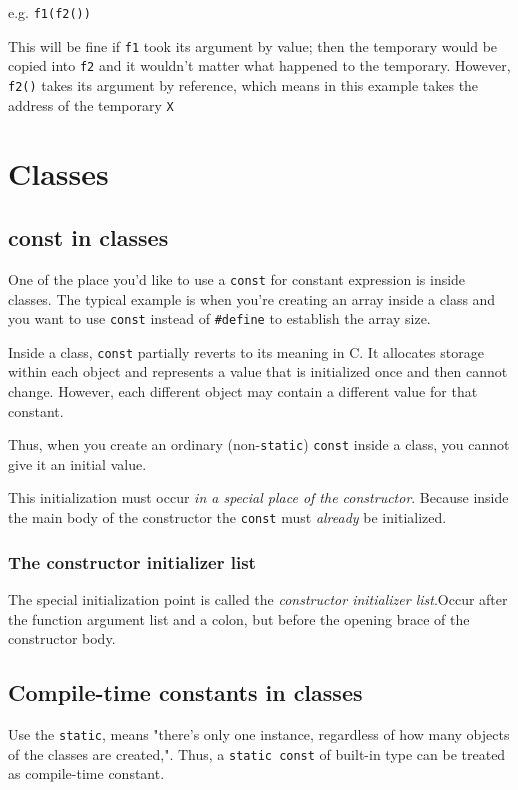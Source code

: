 \documentclass[11pt, a4paper]{book}
\begin{document}
e.g. \verb|f1(f2())|

This will be fine if \verb|f1| took its argument by value; then the temporary
would be copied into \verb|f2| and it wouldn't matter what happened to the
temporary. However, \verb|f2()| takes its argument by reference, which means in
this example takes the address of the temporary \verb|X|

\section{Classes}
\subsection{const in classes}
One of the place you'd like to use a \verb|const| for constant expression is
inside classes. The typical example is when you're creating an array inside a
class and you want to use \verb|const| instead of \verb|#define| to establish
the array size.

Inside a class, \verb|const| partially reverts to its meaning in C. It allocates
storage within each object and represents a value that is initialized once and
then cannot change. However, each different object may contain a different value
for that constant.

Thus, when you create an ordinary (non-\verb|static|) \verb|const| inside a
class, you cannot give it an initial value.

This initialization must occur \emph{in a special place of the constructor}.
Because inside the main body of the constructor the \verb|const| must
\emph{already} be initialized.

\subsubsection{The constructor initializer list}
The special initialization point is called the \emph{constructor initializer
list}.Occur after the function argument list and a colon, but before the opening
brace of the constructor body.

\subsection{Compile-time constants in classes}
Use the \verb|static|, means "there's only one instance, regardless of how many
objects of the classes are created,". Thus, a \verb|static const| of built-in
type can be treated as compile-time constant.
\end{document}
